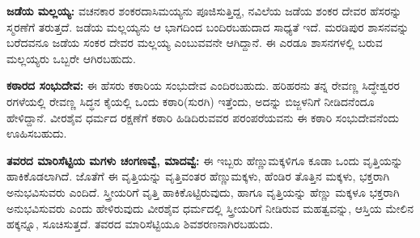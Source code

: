 \textbf{ಜಡೆಯ ಮಲ್ಲಯ್ಯ:} ವಚನಕಾರ ಶಂಕರದಾಸಿಮಯ್ಯನು ಪೂಜಿಸುತ್ತಿದ್ದ, ನವಿಲೆಯ ಜಡೆಯ ಶಂಕರ ದೇವರ ಹೆಸರನ್ನು ಸ್ಮರಣೆಗೆ ತರುತ್ತದೆ. ಜಡೆಯ ಮಲ್ಲಯ್ಯನು ಆ ಭಾಗದಿಂದ ಬಂದಿರಬಹುದಾದ ಸಾಧ್ಯತೆ ಇದೆ. ಮರಡಿಪುರ ಶಾಸನವನ್ನು ಬರೆದವನೂ ಜಡೆಯ ಸಂಕರ ದೇವರ ಮಲ್ಲಯ್ಯ ಎಂಬುವವನೇ ಆಗಿದ್ದಾನೆ. ಈ ಎರಡೂ ಶಾಸನಗಳಲ್ಲಿ ಬರುವ ಮಲ್ಲಯ್ಯರು ಒಬ್ಬರೇ ಆಗಿರಬಹುದು.

\textbf{ಕಠಾರದ ಸಂಭುದೇವ:} ಈ ಹೆಸರು ಕಠಾರಿಯ ಸಂಭುದೇವ ಎಂದಿರಬಹುದು. ಹರಿಹರನು ತನ್ನ ರೇವಣ್ಣ ಸಿದ್ಧೇಶ್ವರರ ರಗಳೆಯಲ್ಲಿ ರೇವಣ್ಣ ಸಿದ್ಧನ ಕೈಯಲ್ಲಿ ಒಂದು ಕಠಾರಿ(ಸುರಗಿ) ಇತ್ತೆಂದು, ಅದನ್ನು ಬಿಜ್ಜಳನಿಗೆ ನೀಡಿದನೆಂದೂ ಹೇಳಿದ್ದಾನೆ. ವೀರಶೈವ ಧರ್ಮದ ರಕ್ಷಣೆಗೆ ಕಠಾರಿ ಹಿಡಿದಿರುವವರ ಪರಂಪರೆಯವನು ಈ ಕಠಾರಿ ಸಂಭುದೇವನೆಂದು ಊಹಿಸಬಹುದು.

\textbf{ತವರದ ಮಾರಿಸೆಟ್ಟಿಯ ಮಗಳು ಚಂಗಣವ್ವೆ, ಮಾದವ್ವೆ:} ಈ ಇಬ್ಬರು ಹೆಣ್ಣುಮಕ್ಕಳಿಗೂ ಕೂಡಾ ಒಂದು ವೃತ್ತಿಯನ್ನು ಹಾಕಿಕೊಡಲಾಗಿದೆ. ಜೊತೆಗೆ ಈ ವೃತ್ತಿಯನ್ನು ವೃತ್ತಿವಂತರ ಹೆಣ್ಣುಮಕ್ಕಳು, ಹೆಂಡಿರ ತೊತ್ತಿನ ಮಕ್ಕಳು, ಭಕ್ತರಾಗಿ ಅನುಭವಿಸುವರು ಎಂದಿದೆ. ಸ್ತ್ರೀಯರಿಗೆ ವೃತ್ತಿ ಹಾಕಿಕೊಟ್ಟಿರುವುದು, ಹಾಗೂ ವೃತ್ತಿಯನ್ನು ಹೆಣ್ಣು ಮಕ್ಕಳೂ ಭಕ್ತರಾಗಿ ಅನುಭವಿಸುವರು ಎಂದು ಹೇಳಿರುವುದು ವೀರಶೈವ ಧರ್ಮದಲ್ಲಿ ಸ್ತ್ರೀಯರಿಗೆ ನೀಡಿರುವ ಮಹತ್ವವನ್ನು, ಆಸ್ತಿಯ ಮೇಲಿನ ಹಕ್ಕನ್ನೂ, ಸೂಚಿಸುತ್ತದೆ. ತವರದ ಮಾರಿಸೆಟ್ಟಿಯೂ ಶಿವಶರಣನಾಗಿರಬಹುದು.

